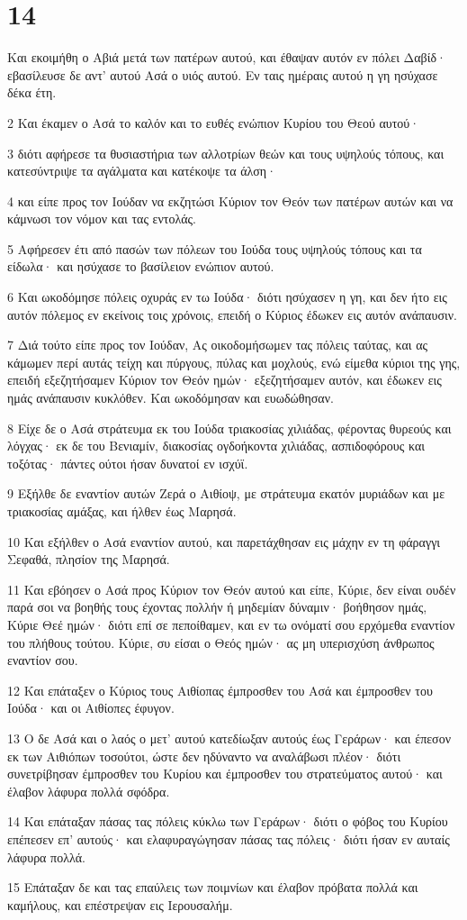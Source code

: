 \chapter{14}

\par Και εκοιμήθη ο Αβιά μετά των πατέρων αυτού, και έθαψαν αυτόν εν πόλει Δαβίδ· εβασίλευσε δε αντ' αυτού Ασά ο υιός αυτού. Εν ταις ημέραις αυτού η γη ησύχασε δέκα έτη.
\par 2 Και έκαμεν ο Ασά το καλόν και το ευθές ενώπιον Κυρίου του Θεού αυτού·
\par 3 διότι αφήρεσε τα θυσιαστήρια των αλλοτρίων θεών και τους υψηλούς τόπους, και κατεσύντριψε τα αγάλματα και κατέκοψε τα άλση·
\par 4 και είπε προς τον Ιούδαν να εκζητώσι Κύριον τον Θεόν των πατέρων αυτών και να κάμνωσι τον νόμον και τας εντολάς.
\par 5 Αφήρεσεν έτι από πασών των πόλεων του Ιούδα τους υψηλούς τόπους και τα είδωλα· και ησύχασε το βασίλειον ενώπιον αυτού.
\par 6 Και ωκοδόμησε πόλεις οχυράς εν τω Ιούδα· διότι ησύχασεν η γη, και δεν ήτο εις αυτόν πόλεμος εν εκείνοις τοις χρόνοις, επειδή ο Κύριος έδωκεν εις αυτόν ανάπαυσιν.
\par 7 Διά τούτο είπε προς τον Ιούδαν, Ας οικοδομήσωμεν τας πόλεις ταύτας, και ας κάμωμεν περί αυτάς τείχη και πύργους, πύλας και μοχλούς, ενώ είμεθα κύριοι της γης, επειδή εξεζητήσαμεν Κύριον τον Θεόν ημών· εξεζητήσαμεν αυτόν, και έδωκεν εις ημάς ανάπαυσιν κυκλόθεν. Και ωκοδόμησαν και ευωδώθησαν.
\par 8 Είχε δε ο Ασά στράτευμα εκ του Ιούδα τριακοσίας χιλιάδας, φέροντας θυρεούς και λόγχας· εκ δε του Βενιαμίν, διακοσίας ογδοήκοντα χιλιάδας, ασπιδοφόρους και τοξότας· πάντες ούτοι ήσαν δυνατοί εν ισχύϊ.
\par 9 Εξήλθε δε εναντίον αυτών Ζερά ο Αιθίοψ, με στράτευμα εκατόν μυριάδων και με τριακοσίας αμάξας, και ήλθεν έως Μαρησά.
\par 10 Και εξήλθεν ο Ασά εναντίον αυτού, και παρετάχθησαν εις μάχην εν τη φάραγγι Σεφαθά, πλησίον της Μαρησά.
\par 11 Και εβόησεν ο Ασά προς Κύριον τον Θεόν αυτού και είπε, Κύριε, δεν είναι ουδέν παρά σοι να βοηθής τους έχοντας πολλήν ή μηδεμίαν δύναμιν· βοήθησον ημάς, Κύριε Θεέ ημών· διότι επί σε πεποίθαμεν, και εν τω ονόματί σου ερχόμεθα εναντίον του πλήθους τούτου. Κύριε, συ είσαι ο Θεός ημών· ας μη υπερισχύση άνθρωπος εναντίον σου.
\par 12 Και επάταξεν ο Κύριος τους Αιθίοπας έμπροσθεν του Ασά και έμπροσθεν του Ιούδα· και οι Αιθίοπες έφυγον.
\par 13 Ο δε Ασά και ο λαός ο μετ' αυτού κατεδίωξαν αυτούς έως Γεράρων· και έπεσον εκ των Αιθιόπων τοσούτοι, ώστε δεν ηδύναντο να αναλάβωσι πλέον· διότι συνετρίβησαν έμπροσθεν του Κυρίου και έμπροσθεν του στρατεύματος αυτού· και έλαβον λάφυρα πολλά σφόδρα.
\par 14 Και επάταξαν πάσας τας πόλεις κύκλω των Γεράρων· διότι ο φόβος του Κυρίου επέπεσεν επ' αυτούς· και ελαφυραγώγησαν πάσας τας πόλεις· διότι ήσαν εν αυταίς λάφυρα πολλά.
\par 15 Επάταξαν δε και τας επαύλεις των ποιμνίων και έλαβον πρόβατα πολλά και καμήλους, και επέστρεψαν εις Ιερουσαλήμ.


